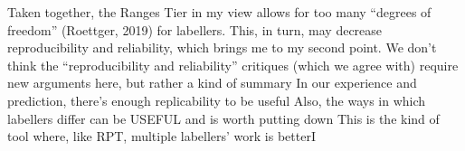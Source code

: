 \markdownRendererUlEndTight \markdownRendererUlItemEnd 
\markdownRendererUlItem Taken together, the Ranges Tier in my view allows for too many “degrees of freedom” (Roettger, 2019) for labellers. This, in turn, may decrease reproducibility and reliability, which brings me to my second point.\markdownRendererUlItemEnd 
\markdownRendererUlItem We don’t think the “reproducibility and reliability” critiques (which we agree with) require new arguments here, but rather a kind of summary\markdownRendererInterblockSeparator
{}\markdownRendererUlBeginTight
\markdownRendererUlItem In our experience and prediction, there’s enough replicability to be useful\markdownRendererUlItemEnd 
\markdownRendererUlItem Also, the ways in which labellers differ can be USEFUL and is worth putting down\markdownRendererUlItemEnd 
\markdownRendererUlItem This is the kind of tool where, like RPT, multiple labellers’ work is better\markdownRendererCircumflex\markdownRendererCircumflex I\markdownRendererUlItemEnd 
\markdownRendererUlEndTight \markdownRendererUlItemEnd 
\markdownRendererUlEndTight 
\markdownRendererSectionEnd 
\markdownRendererSectionEnd \markdownRendererDocumentEnd